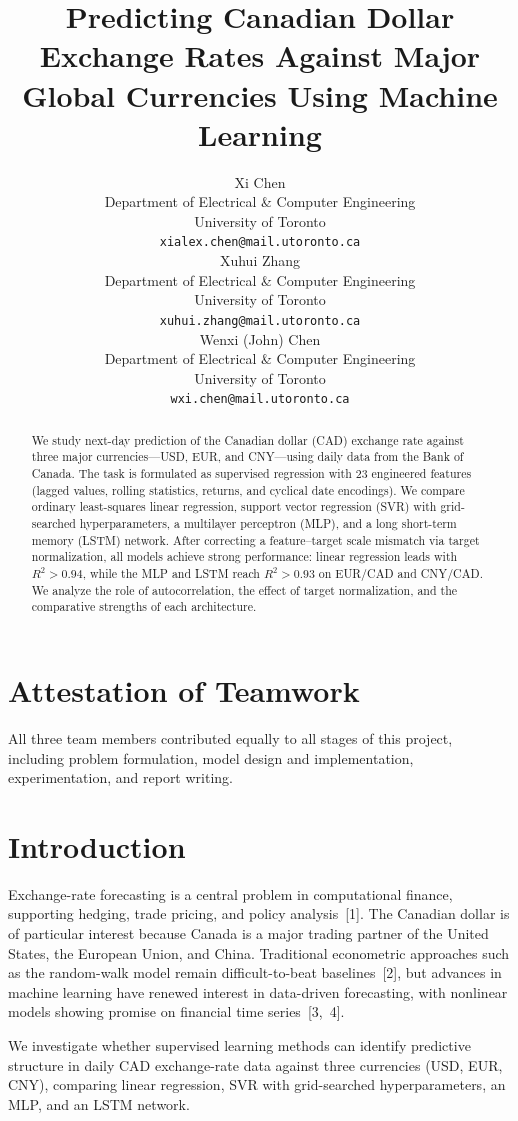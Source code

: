 \documentclass{article}
\title{Predicting Canadian Dollar Exchange Rates Against Major Global Currencies Using Machine Learning}
\author{%
  Xi Chen\\
  Department of Electrical \& Computer Engineering\\
  University of Toronto\\
  \texttt{xialex.chen@mail.utoronto.ca} \\
  \And
  Xuhui Zhang\\
  Department of Electrical \& Computer Engineering\\
  University of Toronto\\
  \texttt{xuhui.zhang@mail.utoronto.ca} \\
  \And
  Wenxi (John) Chen\\
  Department of Electrical \& Computer Engineering\\
  University of Toronto\\
  \texttt{wxi.chen@mail.utoronto.ca} \\
}
\begin{document}
\maketitle


\begin{abstract}
We study next-day prediction of the Canadian dollar (CAD) exchange rate against three major currencies---USD, EUR, and CNY---using daily data from the Bank of Canada. The task is formulated as supervised regression with 23 engineered features (lagged values, rolling statistics, returns, and cyclical date encodings). We compare ordinary least-squares linear regression, support vector regression (SVR) with grid-searched hyperparameters, a multilayer perceptron (MLP), and a long short-term memory (LSTM) network. After correcting a feature--target scale mismatch via target normalization, all models achieve strong performance: linear regression leads with $R^2 > 0.94$, while the MLP and LSTM reach $R^2 > 0.93$ on EUR/CAD and CNY/CAD. We analyze the role of autocorrelation, the effect of target normalization, and the comparative strengths of each architecture.
\end{abstract}

\section*{Attestation of Teamwork}
All three team members contributed equally to all stages of this project, including problem formulation, model design and implementation, experimentation, and report writing.


\section{Introduction}

Exchange-rate forecasting is a central problem in computational finance, supporting hedging, trade pricing, and policy analysis~[1]. The Canadian dollar is of particular interest because Canada is a major trading partner of the United States, the European Union, and China. Traditional econometric approaches such as the random-walk model remain difficult-to-beat baselines~[2], but advances in machine learning have renewed interest in data-driven forecasting, with nonlinear models showing promise on financial time series~[3,~4].

We investigate whether supervised learning methods can identify predictive structure in daily CAD exchange-rate data against three currencies (USD, EUR, CNY), comparing linear regression, SVR with grid-searched hyperparameters, an MLP, and an LSTM network.
\end{document}
